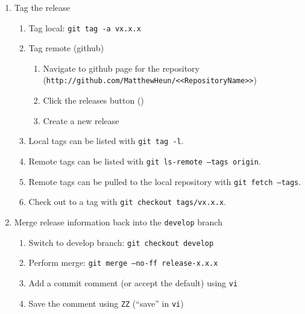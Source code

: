 \documentclass{article}
\begin{document}
\begin{enumerate}
  \item Tag the release
  \begin{enumerate}

    \item Tag local: \texttt{git tag -a vx.x.x}

    \item Tag remote (github)
	\begin{enumerate}

	  \item Navigate to github page for the repository\\
	  		(\texttt{http://github.com/MatthewHeun/<<RepositoryName>>})

	  \item Click the releases button ()
	  
	  \item Create a new release

	\end{enumerate}
	\item Local tags can be listed with \texttt{git tag -l}.
	
	\item Remote tags can be listed with \texttt{git ls-remote --tags origin}.

	\item Remote tags can be pulled to the local repository with \texttt{git fetch --tags}.
	
	\item Check out to a tag with \texttt{git checkout tags/vx.x.x}.
	
  \end{enumerate}
  \item Merge release information back into the \texttt{develop} branch
  \begin{enumerate}

	\item Switch to develop branch: \texttt{git checkout develop}

    \item Perform merge: \texttt{git merge --no-ff release-x.x.x}
	
	\item Add a commit comment (or accept the default) using \texttt{vi} 
	
	\item Save the comment using \texttt{ZZ} (``save'' in \texttt{vi})


\end{enumerate}
\end{enumerate}
\end{document}
